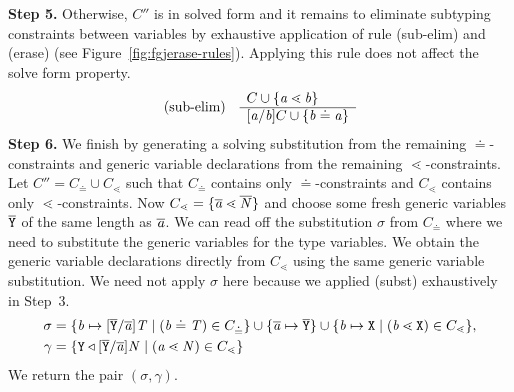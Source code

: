 \textbf{Step 5.} Otherwise, $C''$ is in solved form and it remains to eliminate subtyping constraints between variables by exhaustive application of rule
(sub-elim) and (erase) (see Figure~\ref{fig:fgjerase-rules}). Applying this rule does not affect the solve form property.
\begin{gather*}
  \begin{array}[c]{lll}
    \text{(sub-elim)} &
                     \begin{array}[c]{l}
                       C \cup \{ \mathit{ a } \lessdot \mathit{ b } \}\\
                       \hline
                       [\mathit{ a }/\mathit{ b }]C \cup \{ \mathit{ b } \doteq \mathit{ a } \}
                     \end{array}
  \end{array}
\end{gather*}
\textbf{Step 6.} We finish by generating a solving substitution from the remaining $\doteq$-constraints
and generic variable declarations from the remaining $\lessdot$-constraints. Let $C'' = C_{\doteq} \cup C_{\lessdot}$ such that $C_{\doteq}$
contains only $\doteq$-constraints and $C_{\lessdot}$ contains only $\lessdot$-constraints. Now $C_{\lessdot} = \{  \overline{\mathit{\mathit{ a }}} \lessdot
  \overline{\mathit{N}} \}$ and choose some fresh generic variables $\overline{\tt Y}$ of the same length as $\overline{\mathit{\mathit{ a }}}$. We can read off the substitution $\sigma$
from $C_{\doteq}$ where we need to substitute the generic variables for the type variables. We obtain the generic variable declarations
directly from $C_{\lessdot}$ using the same generic variable substitution. We need not apply $\sigma$ here because
we applied (subst) exhaustively in Step~3.
\begin{align*}
  \sigma &=
           \{ \mathit{ b } \mapsto [\overline{\tt Y}/\overline{\tt \mathit{ a }}]\mathit{T} \mid
           (\mathit{ b } \doteq \mathit{T}) \in C_{\doteq} \}
           \cup 
           \{ \overline{\mathit{\mathit{ a }}} \mapsto \overline{\tt Y} \}
           \cup 
           \{ {\mathit{ b }} \mapsto {\tt X} \mid (\mathit{ b } \lessdot {\tt X}) \in C_{\lessdot} \}, \\
  \gamma{} & =
                     \{ \texttt{Y} \triangleleft [\overline{\tt Y}/\overline{\tt \mathit{ a }}]\mathit{N} \mid (\mathit{ a } \lessdot \mathit{N}) \in C_{\lessdot} \}
\end{align*}
We return the pair $(\sigma, \gamma)$.


